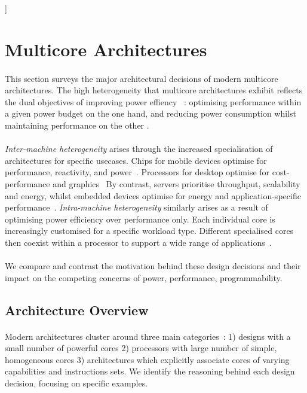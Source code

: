 ]
\section{Multicore Architectures}
\paragraph{}  This section surveys the major architectural decisions of modern multicore 
architectures. The high heterogeneity that multicore architectures exhibit
reflects the dual objectives of improving power effiency ~\cite{borkar2011future}:
optimising performance within a given power budget on the one hand, 
and reducing power consumption whilst maintaining performance on the other .



\paragraph{} \emph{Inter-machine heterogeneity} arises through the
increased specialisation of architectures for specific usecases. Chips for
mobile devices optimise for performance, reactivity, and power~\cite{hennessy2006comparchquantitative}.
Processors for desktop optimise for cost-performance and graphics~\cite{hennessy2006comparchquantitative}
By contrast, servers prioritise throughput, scalability and energy,
whilst embedded devices optimise for energy and application-specific
performance~\cite{hennessy2006comparchquantitative}. \emph {Intra-machine heterogeneity}  similarly arises as a result of optimising power efficiency over 
performance only. Each individual core is increasingly customised
for a specific workload type. Different specialised cores then coexist within
a processor to support a wide range of applications~\cite{5695539,balakrishnan2005impactperfasym}. 

\paragraph{} We compare and contrast the motivation behind these
design decisions and their impact on the competing
concerns of power, performance, programmability.

\subsection{Architecture Overview}

\paragraph{} Modern architectures cluster around three main categories~\cite{Vajda:1414193}: 1) designs with a small number of powerful cores 2) processors with large number of simple, homogeneous cores 3) architectures which explicitly associate cores of varying capabilities and instructions sets. We identify the
reasoning behind each design decision, focusing on specific examples.


